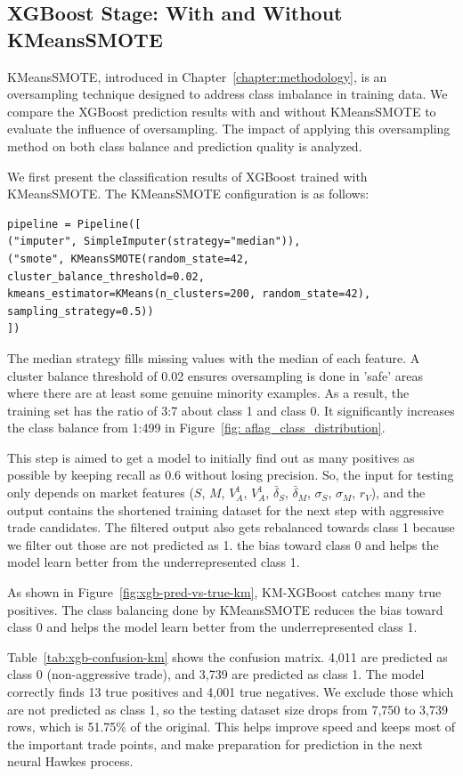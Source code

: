 \subsection{XGBoost Stage: With and Without KMeansSMOTE}

KMeansSMOTE, introduced in Chapter~\ref{chapter:methodology}, is an oversampling technique designed to address class imbalance in training data. We compare the XGBoost prediction results with and without KMeansSMOTE to evaluate the influence of oversampling. The impact of applying this oversampling method on both class balance and prediction quality is analyzed.

We first present the classification results of XGBoost trained with KMeansSMOTE. The KMeansSMOTE configuration is as follows:

\begin{verbatim}
pipeline = Pipeline([
("imputer", SimpleImputer(strategy="median")),
("smote", KMeansSMOTE(random_state=42,
cluster_balance_threshold=0.02,
kmeans_estimator=KMeans(n_clusters=200, random_state=42),
sampling_strategy=0.5))
])
\end{verbatim}

The median strategy fills missing values with the median of each feature. A cluster balance threshold of 0.02 ensures oversampling is done in 'safe' areas where there are at least some genuine minority examples. As a result, the training set has the ratio of 3:7 about class 1 and class 0. It significantly increases the class balance from 1:499 in Figure~\ref{fig: aflag_class_distribution}.

This step is aimed to get a model to initially find out as many positives as possible by keeping recall as 0.6 without losing precision. So, the input for testing only depends on market features ($S$, $M$, $V_A^{1}$, $V_A^{1}$, $\bar{\delta}_S$, $\bar{\delta}_M$, $\sigma_S$, $\sigma_M$, $r_V$), and the output contains the shortened training dataset for the next step with aggressive trade candidates. The filtered output also gets rebalanced towards class 1 because we filter out those are not predicted as 1. the bias toward class 0 and helps the model learn better from the underrepresented class 1.

As shown in Figure~\ref{fig:xgb-pred-vs-true-km}, KM-XGBoost catches many true positives. The class balancing done by KMeansSMOTE reduces the bias toward class 0 and helps the model learn better from the underrepresented class 1.

Table~\ref{tab:xgb-confusion-km} shows the confusion matrix. 4,011 are predicted as class 0 (non-aggressive trade), and 3,739 are predicted as class 1. The model correctly finds 13 true positives and 4,001 true negatives. We exclude those which are not predicted as class 1, so the testing dataset size drops from 7,750 to 3,739 rows, which is 51.75\% of the original. This helps improve speed and keeps most of the important trade points, and make preparation for prediction in the next neural Hawkes process.

